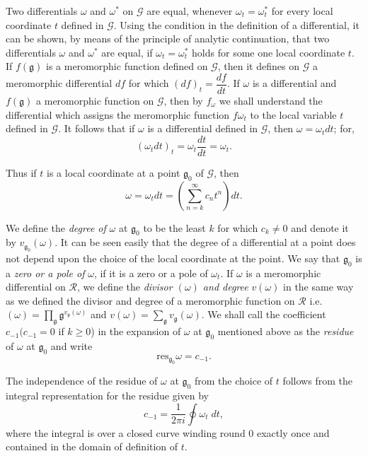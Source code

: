 Two differentials $\omega$ and $\omega^{\ast}$ on $\mathcal{G}$ are
equal, whenever $\omega_t = \omega^{\ast}_t$ for every local
coordinate $t$ defined in $\mathcal{G}$. Using the condition in the
definition of a differential, it can be shown, by means of the
principle of analytic continuation, that two differentials $\omega$
and $\omega^{\ast}$ are equal, if $\omega_t=\omega^{\ast}_t$
holds \pageoriginale for some one local coordinate $t$. If
$f(\mathfrak{g})$ is a meromorphic function defined on $\mathcal{G}$,
then it defines on $\mathcal{G}$ a meromorphic differential $df$ for
which $(df)_t=\dfrac{df}{dt}$. If $\omega$ is a differential and
$f(\mathfrak{g})$ a meromorphic function on $\mathcal{G}$, then by
$f_{\omega}$ we shall understand the differential which assigns the
meromorphic function $f\omega_t$ to the local variable $t$ defined in
$\mathcal{G}$. It follows that if $\omega$ is a differential defined
in $\mathcal{G}$, then $\omega=\omega_tdt$; for,
$$
(\omega_t dt)_t = \omega_t \frac{dt}{dt} = \omega_t.
$$

Thus if $t$ is a local coordinate at a point $\mathfrak{g}_0$ of
$\mathcal{G}$, then 
$$
\omega = \omega_t dt = \left(\sum^{\infty}_{n=k} c_n t^n\right) dt.
$$

We define the \textit{degree of} $\omega$ at $\mathfrak{g}_0$ to be
the least $k$ for which $c_k \neq 0$ and denote it by
$v_{\mathfrak{g}_0}(\omega)$. It can be seen easily that the degree of
a differential at a point does not depend upon the choice of the local
coordinate at the point. We say that $\mathfrak{g}_0$ is a
\textit{zero or a pole of} $\omega$, if it is a zero or a pole of
$\omega_t$. If $\omega$ is a meromorphic differential on
$\mathscr{R}$, we define the \textit{divisor $(\omega)$ and degree}
$v(\omega)$ in the same way as we defined the divisor and degree of a
meromorphic function on $\mathscr{R}$ i.e. $(\omega) =
\prod\limits_{\mathfrak{g}} \mathfrak{g}^{v_{\mathfrak{g}}(\omega)}$ and
$v(\omega) = \sum\limits_{\mathfrak{g}} v_{\mathfrak{g}}(\omega)$. We shall
call the coefficient $c_{-1} (c_{-1}= 0$ if $k\geq 0$) in the
expansion of $\omega$ at $\mathfrak{g}_0$ mentioned above as the
\textit{residue} of $\omega$ at $\mathfrak{g}_0$ and write 
$$
\text{res}_{\mathfrak{g}_0} \omega = c_{-1}.
$$

The independence of the residue of $\omega$ at $\mathfrak{g}_0$ from
the choice of $t$ follows \pageoriginale from the integral
representation for the residue given by 
$$
c_{-1} = \frac{1}{2\pi i} \oint \omega_t \; dt, 
$$
where the integral is over a closed curve winding round 0 exactly
once and contained in the domain of definition of $t$.

